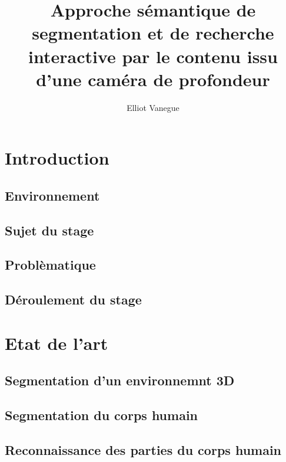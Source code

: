 \documentclass[a4paper,11pt]{article}
\title{Approche sémantique de segmentation et de recherche interactive par le contenu issu d’une caméra de profondeur}
\author{Elliot Vanegue}
\begin{document}
\maketitle
\newpage
\tableofcontents
\newpage

\begin{abstract}
\end{abstract}

\section{Introduction}
\subsection{Environnement}
\subsection{Sujet du stage}
\subsection{Problèmatique}
\subsection{Déroulement du stage}

\section{Etat de l'art}
\subsection{Segmentation d'un environnemnt 3D}

\subsection{Segmentation du corps humain}

\subsection{Reconnaissance des parties du corps humain}
\end{document}
